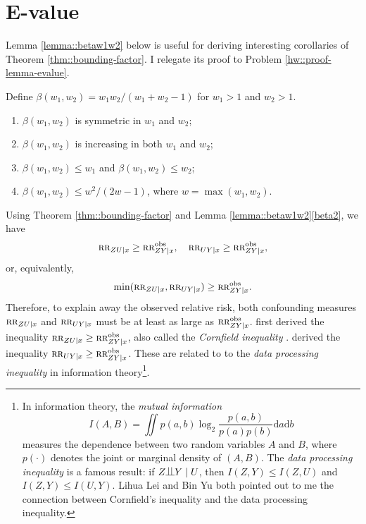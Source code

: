 \section{E-value}

Lemma \ref{lemma::betaw1w2} below is useful for deriving interesting corollaries of Theorem \ref{thm::bounding-factor}. I relegate its proof to Problem \ref{hw::proof-lemma-evalue}. 

\begin{lemma}
\label{lemma::betaw1w2}
Define $\beta(w_1, w_2) = w_1 w_2/(w_1 + w_2 - 1)$ for $w_1 > 1$ and $w_2 > 1$.  
\begin{enumerate}
[(1)]
\item
$\beta(w_1, w_2)$ is symmetric in $w_1$ and $w_2$;
\item
$\beta(w_1, w_2)$ is increasing in both $w_1$ and $w_2$;
\item\label{beta2}
$\beta(w_1, w_2) \leq w_1$ and $\beta(w_1, w_2) \leq w_2$;
\item\label{beta3}
$\beta(w_1, w_2) \leq w^2/(2w-1)$, where $w = \max(w_1, w_2)$.
\end{enumerate}
\end{lemma}



 


Using Theorem \ref{thm::bounding-factor} and Lemma \ref{lemma::betaw1w2}\eqref{beta2}, we have
$$
 \textsc{rr}_{ZU\mid x} \geq \textsc{rr}_{ZY\mid x}^{\textup{obs}}, \quad  \textsc{rr}_{UY\mid x}  \geq \textsc{rr}_{ZY\mid x}^{\textup{obs}} , 
$$
or, equivalently, 
$$
\min( \textsc{rr}_{ZU\mid x} ,  \textsc{rr}_{UY\mid x} ) \geq \textsc{rr}_{ZY\mid x}^{\textup{obs}}.
$$
Therefore, to explain away the observed relative risk, both confounding measures $\textsc{rr}_{ZU\mid x} $ and $  \textsc{rr}_{UY\mid x}$ must be at least as large as $\textsc{rr}_{ZY\mid x}^{\textup{obs}}$.
\citet{Cornfield::1959} first derived the inequality $\textsc{rr}_{ZU\mid x} \geq \textsc{rr}_{ZY\mid x}^{\textup{obs}}$, also called the {\it Cornfield inequality} \citep{gastwirth1998cornfield}. \citet{Schlesselman::1978} derived the inequality $\textsc{rr}_{UY\mid x}  \geq \textsc{rr}_{ZY\mid x}^{\textup{obs}}$. 
These are related to to the {\it data processing inequality} in information theory\footnote{In information theory, the {\it mutual information}  
$$
I(A,B) = \iint p(a,b) \log_2 \frac{  p(a,b) }{p(a)p(b)} \text{d} a \text{d} b
$$ 
measures the dependence between two random variables $A$ and $B$, where $p(\cdot)$ denotes the joint or marginal density of $(A,B)$. The {\it data processing inequality}  is a famous result: if $Z\ind Y \mid U$, then $I(Z,Y) \leq I(Z,U)$ and $I(Z,Y) \leq I(U,Y)$.
Lihua Lei and Bin Yu both pointed out to me the connection between Cornfield's inequality and the data processing inequality. 
}. 



